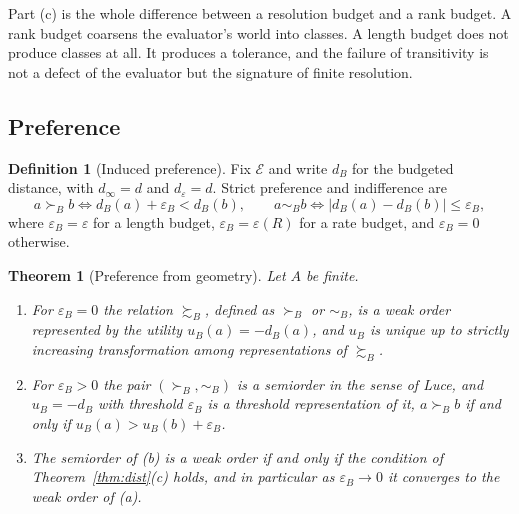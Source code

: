 \documentclass[11pt]{article}
\newtheorem{theorem}{Theorem}
\theoremstyle{definition}
\newtheorem{definition}{Definition}
\theoremstyle{remark}
\newcommand{\Ev}{\mathcal{E}}
\begin{document}
Part (c) is the whole difference between a resolution budget and a rank budget.
A rank budget coarsens the evaluator's world into classes.
A length budget does not produce classes at all.
It produces a tolerance, and the failure of transitivity is not a defect of the evaluator but the signature of finite resolution.

\subsection{Preference}

\begin{definition}[Induced preference]
\label{def:pref}
Fix $\Ev$ and write $d_{B}$ for the budgeted distance, with $d_{\infty}=d$ and $d_{\varepsilon}=d$.
Strict preference and indifference are
\[
a\succ_{B}b \iff d_{B}(a)+\varepsilon_{B}<d_{B}(b),
\qquad
a\sim_{B}b \iff |d_{B}(a)-d_{B}(b)|\le\varepsilon_{B},
\]
where $\varepsilon_{B}=\varepsilon$ for a length budget, $\varepsilon_{B}=\varepsilon(R)$ for a rate budget, and $\varepsilon_{B}=0$ otherwise.
\end{definition}

\begin{theorem}[Preference from geometry]
\label{thm:pref}
Let $A$ be finite.
\begin{enumerate}
\item[(a)] For $\varepsilon_{B}=0$ the relation $\succsim_{B}$, defined as $\succ_{B}$ or $\sim_{B}$, is a weak order represented by the utility $u_{B}(a)=-d_{B}(a)$, and $u_{B}$ is unique up to strictly increasing transformation among representations of $\succsim_{B}$.
\item[(b)] For $\varepsilon_{B}>0$ the pair $(\succ_{B},\sim_{B})$ is a semiorder in the sense of Luce, and $u_{B}=-d_{B}$ with threshold $\varepsilon_{B}$ is a threshold representation of it, $a\succ_{B}b$ if and only if $u_{B}(a)>u_{B}(b)+\varepsilon_{B}$.
\item[(c)] The semiorder of (b) is a weak order if and only if the condition of Theorem~\ref{thm:dist}(c) holds, and in particular as $\varepsilon_{B}\to0$ it converges to the weak order of (a).
\end{enumerate}
\end{theorem}
\end{document}
